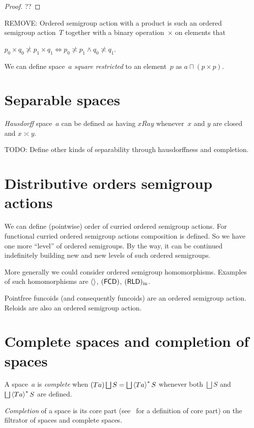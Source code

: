 \begin{proof}
??
\end{proof}

REMOVE: Ordered semigroup action with a product is such an ordered semigroup action~$T$ together with a binary operation~$\times$ on elements that 

\begin{thm}
$p_0\times q_0\nasymp p_1\times q_1 \Leftrightarrow p_0\nasymp p_1\land q_0\nasymp q_1$.
\end{thm}

We can define space~$a$ \emph{square restricted} to an element~$p$ as $a\sqcap(p\times p)$.

\section{Separable spaces}

\emph{Hausdorff} space~$a$ can be defined as having $x\overline{Ra}y$ whenever~$x$ and $y$ are closed and $x\asymp y$.

TODO: Define other kinds of separability through hausdorffness and completion.

\section{Distributive orders semigroup actions}

We can define (pointwise) order of curried ordered semigroup actions. For functional curried ordered semigroup actions composition is defined. So we have one more ``level'' of ordered semigroups. By the way, it can be continued indefinitely building new and new levels of such ordered semigroups.

More generally we could consider ordered semigroup homomorphisms. Examples of such homomorphisms are $\left\langle \right\rangle$, $(\mathsf{FCD})$, $(\mathsf{RLD})_{\mathrm{in}}$.

Pointfree funcoids (and consequently funcoids) are an ordered semigroup action. Reloids are also an ordered semigroup action.

\section{Complete spaces and completion of spaces}

A space~$a$ is \emph{complete} when $(Ta)\bigsqcup S=\bigsqcup\rsupfun{Ta}S$ whenever both $\bigsqcup S$ and $\bigsqcup\rsupfun{Ta}S$ are defined.

\begin{defn}
\emph{Completion} of a space is its core part (see~\cite{volume-1} for a definition of core part) on the filtrator of spaces and complete spaces.
\end{defn}

